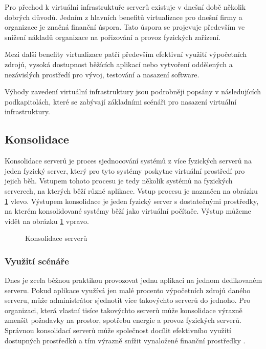 Pro přechod k virtuální infrastruktuře serverů existuje v dnešní době několik dobrých důvodů. Jedním z hlavních benefitů virtualizace pro dnešní firmy a organizace je značná finanční úspora. Tato úspora se
projevuje především ve snížení nákladů organizace na pořizování a provoz fyzických zařízení. 

Mezi další benefity virtualizace patří především efektivní využití výpočetních zdrojů, vysoká dostupnost běžících aplikací nebo vytvoření oddělených a nezávislých prostředí pro vývoj, testování a nasazení software.

Výhody zavedení virtuální infrastruktury jsou podrobněji popsány v následujících podkapitolách, které se zabývají základními scénáři pro nasazení virtuální infrastruktury.

\subsection{Konsolidace}
\label{consolidation}

Konsolidace serverů je proces sjednocování systémů z více fyzických serverů na jeden fyzický server, který pro tyto systémy poskytne virtuální prostředí pro jejich běh. Vstupem tohoto procesu je tedy několik systémů na fyzických serverech,
na kterých běží různé aplikace. Vstup procesu je naznačen na obrázku \ref{consolidation_img} vlevo. Výstupem konsolidace je jeden fyzický server s dostatečnými prostředky, na kterém konsolidované systémy běží jako virtuální počítače.
Výstup můžeme vidět na obrázku \ref{consolidation_img} vpravo.

\begin{figure}
    \centering    
    \caption{Konsolidace serverů}
    \label{consolidation_img}
\end{figure}

\subsubsection*{Využití scénáře}

Dnes je zcela běžnou praktikou provozovat jednu aplikaci na jednom dedikovaném serveru. Pokud aplikace využívá jen malé procento výpočetních zdrojů daného serveru, může administrátor sjednotit více takovýchto serverů
do jednoho. Pro organizaci, která vlastní tisíce takovýchto serverů může konsolidace výrazně zmenšit požadavky na prostor, spotřebu energie a provoz fyzických serverů. Správnou konsolidací serverů může společnost docílit
efektivního využití dostupných prostředků a tím výrazně snížit vynaložené finanční prostředky \cite{reasons}.

